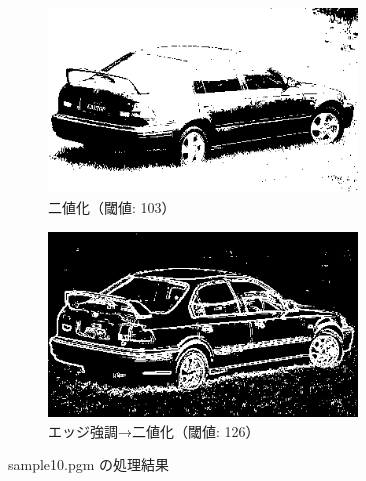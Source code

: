 \documentclass[a4paper,12pt]{jsarticle}
\begin{document}
\begin{figure}[!htbp]
\begin{subfigure}[b]{0.45\textwidth}
    \centering
    \includegraphics[width=0.9\textwidth]{./images/binarized_sample10_binary.png}
    \caption{二値化（閾値: 103）}
\end{subfigure}
\hfill
\begin{subfigure}[b]{0.45\textwidth}
    \centering
    \includegraphics[width=0.9\textwidth]{./images/combined_sample10_combined.png}
    \caption{エッジ強調→二値化（閾値: 126）}
\end{subfigure}
\caption{sample10.pgm の処理結果}
\label{fig:sample10}
\end{figure}
\end{document}
